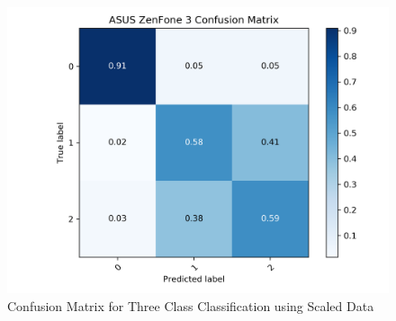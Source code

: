 \begin{figure}[htbp]
\centerline{\includegraphics[width=0.7\linewidth]{ExperimentalResults/scaled_cm.png}}
\caption{Confusion Matrix for Three Class Classification using Scaled Data}
\label{scaledcm}
\end{figure}